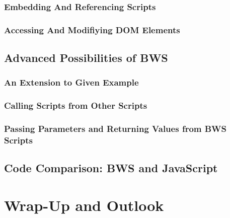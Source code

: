   \subsubsection{Embedding And Referencing Scripts}

 

  \subsubsection{Accessing And Modifiying DOM Elements}


 \subsection{Advanced Possibilities of BWS}
  \subsubsection{An Extension to Given Example}
  \subsubsection{Calling Scripts from Other Scripts}
  \subsubsection{Passing Parameters and Returning Values from BWS Scripts}
 \subsection{Code Comparison: BWS and JavaScript}
\section{Wrap-Up and Outlook}
